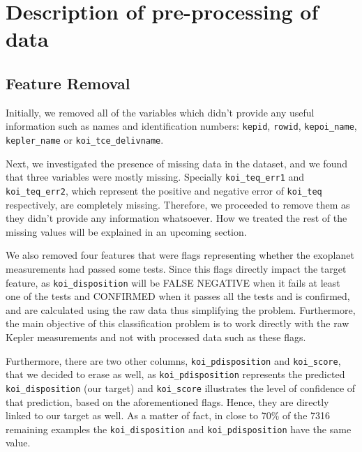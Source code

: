 
\section{Description of pre-processing of data}%
\label{sec:desc-prep}


\subsection{Feature Removal}

Initially, we removed all of the variables which didn't provide any useful information
such as names and identification numbers: \texttt{kepid}, \texttt{rowid}, 
\texttt{kepoi\_name}, \texttt{kepler\_name} or \texttt{koi\_tce\_delivname}.

Next, we investigated the presence of missing data in the dataset, and we found that three
variables were mostly missing. Specially \texttt{koi\_teq\_err1} and 
\texttt{koi\_teq\_err2}, which represent the positive and negative error 
of \texttt{koi\_teq} respectively, are completely missing. Therefore, we proceeded to 
remove them as they didn't provide any information whatsoever. How we treated the rest
of the missing values will be explained in an upcoming section.

We also removed four features that were flags representing whether the exoplanet
measurements had passed some tests. Since this flags directly impact the
target feature, as \texttt{koi\_disposition} will be FALSE NEGATIVE when it fails
at least one of the tests and CONFIRMED when it passes all the tests and is confirmed,
and are calculated using the raw data thus simplifying the problem. Furthermore, the
main objective of this classification problem is to work directly with the raw Kepler
measurements and not with processed data such as these flags.

Furthermore, there are two other columns, \texttt{koi\_pdisposition} and 
\texttt{koi\_score},
that we decided to erase as well, as 
\texttt{koi\_pdisposition} represents the predicted \texttt{koi\_disposition}
(our target) and \texttt{koi\_score} illustrates the level of confidence of
that prediction, based on the aforementioned flags. Hence, they are directly
linked to our target as well. As a matter of fact, in close to 70\% of the
7316 remaining examples the \texttt{koi\_disposition} and \texttt{koi\_pdisposition}
have the same value.


